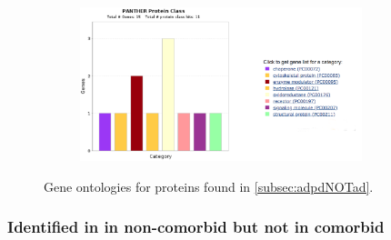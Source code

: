 \begin{figure}[H]
\begin{subfigure}[b]{0.5\linewidth}
\end{subfigure}
\begin{subfigure}[b]{0.5\linewidth}
\centering
\includegraphics[width=0.9\textwidth]{./Figures/GO/adpdNOTad/adpdNOTad4}\par
\end{subfigure}%
\begin{caption}
  {Gene ontologies for proteins found in \ref{subsec:adpdNOTad}.}
\end{caption}
\end{figure}


\subsubsection{Identified in in non-comorbid but not in comorbid}
\label{subsec:adNOTadpd}

